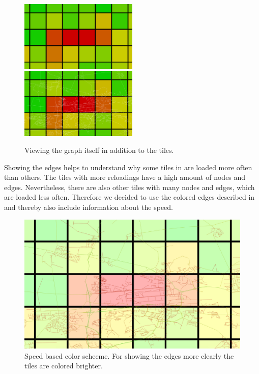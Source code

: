 \documentclass
[
    paper = a4,
    pagesize,
    12 pt,
    oneside,                       %
    open = right,
    DIV = calc,
    BCOR = 0 mm,                   %
    bibtotoc
]
{scrbook}
\begin{document}
\begin{figure}
    \includegraphics[width=0.5\textwidth]{Images/vis-edges-no.png}
    \includegraphics[width=0.5\textwidth]{Images/vis-edges-white.png}
\caption[]{Viewing the graph itself in addition to the tiles.}
\label{fig:white edges}
\end{figure}

Showing the edges helps to understand why some tiles in  are loaded more often than others.
The tiles with more reloadings have a high amount of nodes and edges.
Nevertheless, there are also other tiles with many nodes and edges, which are loaded less often.
Therefore we decided to use the colored edges described in  and thereby also include information about the speed.

\begin{figure}
    \includegraphics[width=\textwidth]{Images/vis-edges-hsv.png}
\caption[]{Speed based color scheeme. For showing the edges more clearly the tiles are colored brighter.}
\label{fig:colored edges}
\end{figure}
\end{document}

